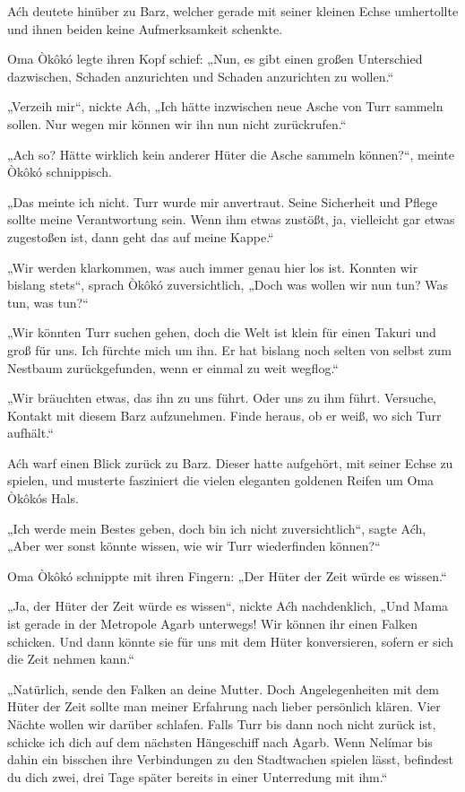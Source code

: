 Aćh deutete hinüber zu Barz, welcher gerade mit seiner kleinen Echse umhertollte und ihnen beiden keine Aufmerksamkeit schenkte.

Oma Òkôkó legte ihren Kopf schief: „Nun, es gibt einen großen Unterschied dazwischen, Schaden anzurichten und Schaden anzurichten zu wollen.“

„Verzeih mir“, nickte Aćh, „Ich hätte inzwischen neue Asche von Turr sammeln sollen. Nur wegen mir können wir ihn nun nicht zurückrufen.“

„Ach so? Hätte wirklich kein anderer Hüter die Asche sammeln können?“, meinte Òkôkó schnippisch.

„Das meinte ich nicht. Turr wurde mir anvertraut. Seine Sicherheit und Pflege sollte meine Verantwortung sein. Wenn ihm etwas zustößt, ja, vielleicht gar etwas zugestoßen ist, dann geht das auf meine Kappe.“

„Wir werden klarkommen, was auch immer genau hier los ist. Konnten wir bislang stets“, sprach Òkôkó zuversichtlich, „Doch was wollen wir nun tun? Was tun, was tun?“

„Wir könnten Turr suchen gehen, doch die Welt ist klein für einen Takuri und groß für uns. Ich fürchte mich um ihn. Er hat bislang noch selten von selbst zum Nestbaum zurückgefunden, wenn er einmal zu weit wegflog.“

„Wir bräuchten etwas, das ihn zu uns führt. Oder uns zu ihm führt. Versuche, Kontakt mit diesem Barz aufzunehmen. Finde heraus, ob er weiß, wo sich Turr aufhält.“

Aćh warf einen Blick zurück zu Barz. Dieser hatte aufgehört, mit seiner Echse zu spielen, und musterte fasziniert die vielen eleganten goldenen Reifen um Oma Òkôkós Hals.

„Ich werde mein Bestes geben, doch bin ich nicht zuversichtlich“, sagte Aćh, „Aber wer sonst könnte wissen, wie wir Turr wiederfinden können?“

Oma Òkôkó schnippte mit ihren Fingern: „Der Hüter der Zeit würde es wissen.“

„Ja, der Hüter der Zeit würde es wissen“, nickte Aćh nachdenklich, „Und Mama ist gerade in der Metropole Agarb unterwegs! Wir können ihr einen Falken schicken. Und dann könnte sie für uns mit dem Hüter konversieren, sofern er sich die Zeit nehmen kann.“

„Natürlich, sende den Falken an deine Mutter. Doch Angelegenheiten mit dem Hüter der Zeit sollte man meiner Erfahrung nach lieber persönlich klären. Vier Nächte wollen wir darüber schlafen. Falls Turr bis dann noch nicht zurück ist, schicke ich dich auf dem nächsten Hängeschiff nach Agarb. Wenn Nelímar bis dahin ein bisschen ihre Verbindungen zu den Stadtwachen spielen lässt, befindest du dich zwei, drei Tage später bereits in einer Unterredung mit ihm.“

